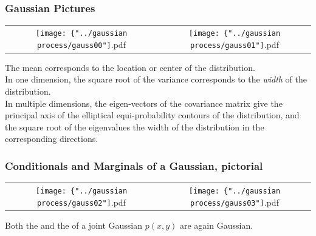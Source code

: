 \begin{frame}
\frametitle{Gaussian Pictures}

\begin{center}
\begin{tabular}{cc}
\texttt{[image: \{"../gaussian process/gauss00"]}.pdf} &
{\texttt{[image: \{"../gaussian process/gauss01"]}.pdf}}
\end{tabular}
\end{center}

The mean corresponds to the location or center of the
distribution.\\[1ex]

In one dimension, the square root of the variance corresponds to the
\emph{width} of the distribution.\\[1ex]

In multiple dimensions, the eigen-vectors of the covariance matrix
give the principal axis of the elliptical equi-probability contours of
the distribution, and the square root of the eigenvalues the width of the
distribution in the corresponding directions.
\end{frame}

\begin{frame}
\frametitle{Conditionals and Marginals of a Gaussian, pictorial}
\begin{center}
\begin{tabular}{cc}
\texttt{[image: \{"../gaussian process/gauss02"]}.pdf} &
{\texttt{[image: \{"../gaussian process/gauss03"]}.pdf}}
\end{tabular}
\end{center}

Both the  and the 
of a joint Gaussian $p(x,y)$ are again Gaussian.
\end{frame}

